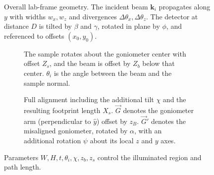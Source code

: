 \begin{figure}[htbp]
  \centering
  \resizebox{0.6\linewidth}{!}{}
  \caption{
  Overall lab-frame geometry.
  The incident beam $\mathbf{k}_i$ propagates along $y$ with widths $w_x,w_z$ and divergences
  $\Delta\theta_x,\Delta\theta_z$.
  The detector at distance $D$ is tilted by $\beta$ and $\gamma$, rotated in plane by $\phi$,
  and referenced to offsets $(x_0,y_0)$.
  }
  \label{fig:waxs_geometry_system}
\end{figure}
\begin{figure}[htbp]
  \centering

  \begin{subfigure}{0.48\linewidth}
    \centering
    \resizebox{\linewidth}{!}{}
    \caption{
    The sample rotates about the goniometer center with offset $Z_s$, and the beam is offset by $Z_b$ below that center. $\theta_i$ is the angle between the beam and the sample normal.
    }
    \label{fig:waxs_geometry_sample_rot}
  \end{subfigure}
  \hfill
  \begin{subfigure}{0.48\linewidth}
    \centering
    \resizebox{\linewidth}{!}{}
    \caption{
    Full alignment including the additional tilt $\chi$ and the resulting footprint length $X_s$. $\vec{G}$ denotes the goniometer arm (perpendicular to $\hat{y}$) offset by $z_B$. $\vec{G}'$ denotes the misaligned goniometer, rotated by $\alpha$, with an additional rotation $\psi$ about its local $z$ and $y$ axes.
    }
    \label{fig:waxs_geometry_sample_full}
  \end{subfigure}

  \caption{
  Parameters $W,H,t,\theta_i,\chi,z_b,z_s$ control the illuminated region and path length.
  }
  \label{fig:waxs_geometry_sample_triptych}
\end{figure}


\pagebreak 
